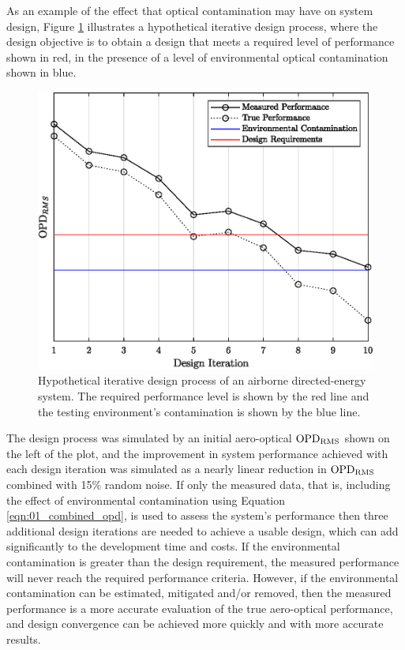 As an example of the effect that optical contamination may have on system design, Figure \ref{fig:01_design_iteration} illustrates a hypothetical iterative design process, where the design objective is to obtain a design that meets a required level of performance shown in red, in the presence of a level of environmental optical contamination shown in blue.
\begin{figure}
  \centering
  \includegraphics{../matlab/01_introduction/design_iteration.eps}
  \caption{Hypothetical iterative design process of an airborne directed-energy system.  The required performance level is shown by the red line and the testing environment's contamination is shown by the blue line.}
  \label{fig:01_design_iteration}
\end{figure}
The design process was simulated by an initial aero-optical $\operatorname{OPD_{RMS}}$ shown on the left of the plot, and the improvement in system performance achieved with each design iteration was simulated as a nearly linear reduction in $\operatorname{OPD_{RMS}}$ combined with 15\% random noise.
If only the measured data, that is, including the effect of environmental contamination using Equation \ref{eqn:01_combined_opd}, is used to assess the system's performance then three additional design iterations are needed to achieve a usable design, which can add significantly to the development time and costs.
If the environmental contamination is greater than the design requirement, the measured performance will never reach the required performance criteria.
However, if the environmental contamination can be estimated, mitigated and/or removed, then the measured performance is a more accurate evaluation of the true aero-optical performance, and design convergence can be achieved more quickly and with more accurate results.

